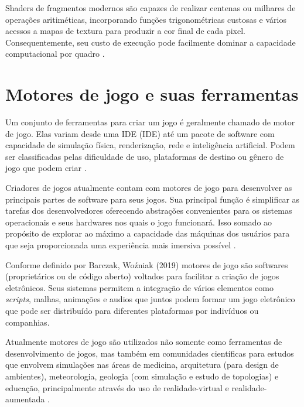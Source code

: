 Shaders de fragmentos modernos são capazes de realizar centenas ou milhares de operações aritiméticas, incorporando funções trigonométricas custosas e vários acessos a mapas de textura para produzir a cor final de cada pixel. Consequentemente, seu custo de execução pode facilmente dominar a capacidade computacional por quadro \cite{lei2008acm}.

\section{Motores de jogo e suas ferramentas}
\label{sec:motores-jogo-ferramentas}

Um conjunto de ferramentas para criar um jogo é geralmente chamado de motor de jogo. Elas variam desde uma IDE (\acrlong{IDE}) até um pacote de software com capacidade de simulação física, renderização, rede e inteligência artificial. Podem ser classificadas pelas dificuldade de uso, plataformas de destino ou gênero de jogo que podem criar \cite{compGameLang}. 

Criadores de jogos atualmente contam com motores de jogo para desenvolver as principais partes de software para seus jogos. Sua principal função é simplificar as tarefas dos desenvolvedores oferecendo abstrações convenientes para os sistemas operacionais e seus hardwares nos quais o jogo funcionará. Isso somado ao propósito de explorar ao máximo a capacidade das máquinas dos usuários para que seja proporcionada uma experiência mais imersiva possível \cite{simon2015unity}.



Conforme definido por Barczak, Woźniak (2019) motores de jogo são softwares (proprietários ou de código aberto) voltados para facilitar a criação de jogos eletrônicos. Seus sistemas permitem a integração de vários elementos como \textit{\Gls{scripts}}, malhas, animações e audios que juntos podem formar um jogo eletrônico que pode ser distribuído para diferentes plataformas por indivíduos ou companhias. 

Atualmente motores de jogo são utilizados não somente como ferramentas de desenvolvimento de jogos, mas também em comunidades científicas para estudos que envolvem simulações nas áreas de medicina, arquitetura (para design de ambientes), meteorologia, geologia (com simulação e estudo de topologias) e educação, principalmente através do uso de \Gls{realidade-virtual} e \Gls{realidade-aumentada} \cite{comparacaoDesempenho2}. 



